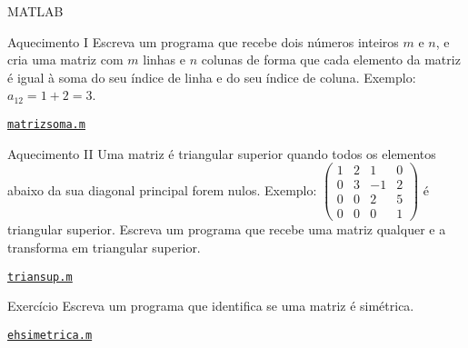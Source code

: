 \documentclass[hyperref={pdfpagelabels=false}]{beamer}
\begin{document}
\begin{frame}
  \begin{center} MATLAB \end{center}
\end{frame}

\begin{frame}{Aquecimento I}
  Escreva um programa que recebe dois números inteiros $m$ e $n$, e cria uma matriz com $m$ linhas e $n$ colunas de forma que cada elemento da matriz é igual à soma do seu índice de linha e do seu índice de coluna.
	\vfill
	Exemplo: $a_{12} = 1+2=3$.
  \vfill
  \begin{center} \href{listings/matrizsoma.m}{\underline{\texttt{matrizsoma.m}}} \end{center}
\end{frame}

\begin{frame}{Aquecimento II}
   Uma matriz é triangular superior quando todos os elementos abaixo da sua diagonal principal forem nulos.
	 \vfill
	 Exemplo: \begin{math}
		 \begin{pmatrix}
	     1 & 2 & 1 & 0\\
	     0 & 3 & -1 & 2\\
	     0 & 0 & 2 & 5\\
	     0 & 0 & 0 & 1
	   \end{pmatrix}
	 \end{math}
	 é triangular superior.
	 \vfill
	 Escreva um programa que recebe uma matriz qualquer e a transforma em
   triangular superior.
   \vfill
   \begin{center} \href{listings/triansup.m}{\underline{\texttt{triansup.m}}} \end{center}
\end{frame}

\begin{frame}{Exercício}
  Escreva um programa que identifica se uma matriz é simétrica.
  \vfill
  \begin{center} \href{listings/ehsimetrica.m}{\underline{\texttt{ehsimetrica.m}}} \end{center}
\end{frame}
\end{document}
